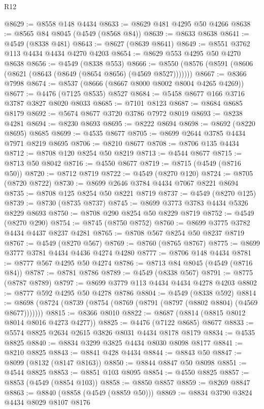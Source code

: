 \begin{lexlean}{R12}
\begin{coremodule}
@8629 := @8558 @148 @4434
@8633 := @8629 @481 @4295 @50 @4266
@8638 := @8565 @84 @8045 (@4549 (@8568 @84))
@8639 := @8633 @8638
@8641 := @4549 (@8338 @481)
@8643 := @8627 (@8639 @8641)
@8649 := @8551 @3762 @113 @4434 @4434 @4270 @4203
@8654 := @8629 @553 @4295 @50 @4270 @8638
@8656 := @4549 (@8338 @553)
@8666 := @8550 (@8576 (@8591 (@8606 (@8621 (@8643 (@8649 (@8654 @8656) (@4569 @8527)))))))
@8667 := @8366 @7998
@8674 := @8537 (@8666 (@8667 @8000 @8002 @8004 @4265 @4269))
@8677 := @4476 (@7125 @8535) @8527
@8684 := @5458 @8677 @166 @3716 @3787 @3827 @8020 @8033
@8685 := @7101 @8123
@8687 := @8684 @8685 @8179
@8692 := @5674 @8677 @3720 @3786 @7972 @8019
@8693 := @8238 @4281
@8694 := @8230 @8693
@8695 := @8222 @8694
@8698 := @8692 (@8220 @8695) @8685
@8699 := @4535 @8677
@8705 := @8699 @2644 @3785 @4434 @7971 @8219 @8695
@8706 := @8210 @8677
@8708 := @8706 @135 @4434
@8712 := @8708 @120 @8254 @50 @8219
@8713 := @4544 @8677
@8715 := @8713 @50 @8042
@8716 := @4550 @8677
@8719 := @8715 (@4549 (@8716 @50))
@8720 := @8712 @8719
@8722 := @4549 (@8270 @120)
@8724 := @8705 (@8720 @8722)
@8730 := @8699 @2646 @3784 @4434 @7067 @8221 @8694
@8735 := @8708 @125 @8254 @50 @8221 @8719
@8737 := @4549 (@8270 @125)
@8739 := @8730 (@8735 @8737)
@8745 := @8699 @3773 @3783 @4434 @5326 @8229 @8693
@8750 := @8708 @290 @8254 @50 @8229 @8719
@8752 := @4549 (@8270 @290)
@8754 := @8745 (@8750 @8752)
@8760 := @8699 @3775 @3782 @4434 @4437 @8237 @4281
@8765 := @8708 @567 @8254 @50 @8237 @8719
@8767 := @4549 (@8270 @567)
@8769 := @8760 (@8765 @8767)
@8775 := @8699 @3777 @3781 @4434 @4436 @4274 @4280
@8777 := @8706 @148 @4434
@8781 := @8777 @567 @4295 @50 @4274
@8786 := @8713 @84 @8045 (@4549 (@8716 @84))
@8787 := @8781 @8786
@8789 := @4549 (@8338 @567)
@8791 := @8775 (@8787 @8789)
@8797 := @8699 @3779 @113 @4434 @4434 @4278 @4203
@8802 := @8777 @592 @4295 @50 @4278 @8786
@8804 := @4549 (@8338 @592)
@8814 := @8698 (@8724 (@8739 (@8754 (@8769 (@8791 (@8797 (@8802 @8804) (@4569 @8677)))))))
@8815 := @8366 @8010
@8822 := @8687 (@8814 (@8815 @8012 @8014 @8016 @4273 @4277))
@8825 := @4476 (@7122 @8685) @8677
@8833 := @5574 @8825 @2634 @2615 @3826 @8031 @4434 @8178 @8179
@8834 := @4535 @8825
@8840 := @8834 @3299 @3825 @4434 @8030 @8098 @8177
@8841 := @8210 @8825
@8843 := @8841 @428 @4434
@8844 := @8843 @50
@8847 := @8099 (@8132 (@8147 @8163))
@8850 := @8844 @8847 @50 @8098
@8851 := @4544 @8825
@8853 := @8851 @103 @8095
@8854 := @4550 @8825
@8857 := @8853 (@4549 (@8854 @103))
@8858 := @8850 @8857
@8859 := @8269 @8847
@8863 := @8840 (@8858 (@4549 (@8859 @50)))
@8869 := @8834 @3790 @3824 @4434 @8029 @8107 @8176

\end{coremodule}
\end{lexlean}
